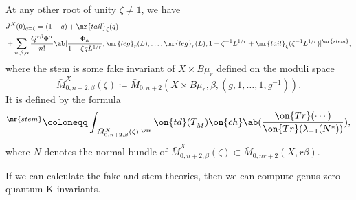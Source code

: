 \begin{prop}
    At any other root of unity \(\zeta \neq 1\), we have
    \begin{align*}
        &J^K(0)_{q = \zeta} = (1-q) + \mr{tail}_{\zeta}(q) \\
        &+ \sum_{n,\beta,\alpha} \frac{Q^{r\beta}\Phi^{\alpha}}{n!} \ab[\frac{\Phi_{\alpha}}{1-\zeta q L^{1/r}}, \mr{leg}_r(L), \ldots, \mr{leg}_r(L), 1 - \zeta^{-1}L^{1/r} + \mr{tail}_{\zeta}(\zeta^{-1} L^{1/r})]^{\mr{stem}},
    \end{align*}
    where the stem is some fake invariant of \(X \times B\mu_r\) defined on the moduli space
    \[ \bar{M}_{0,n+2,\beta}^X(\zeta) \coloneqq \bar{M}_{0,n+2}(X \times B\mu_r, \beta, (g, 1, \ldots, 1, g^{-1})). \]
    It is defined by the formula
    \begin{align*}
        [\cdots]^{\mr{stem}} \coloneqq \int_{[\bar{M}_{0,n+2,\beta}^X(\zeta)]^{\vir}} \on{td}(T_{\bar{M}}) \on{ch}\ab(\frac{\on{Tr}(\cdots)}{\on{Tr}(\lambda_{-1}(N^*))}), 
    \end{align*}
    where \(N\) denotes the normal bundle of \(\bar{M}_{0,n+2,\beta}^X(\zeta) \subset \bar{M}_{0,nr+2}(X, r\beta)\).
\end{prop}

\begin{rmk}
    If we can calculate the fake and stem theories, then we can compute genus zero quantum K invariants.
\end{rmk}

